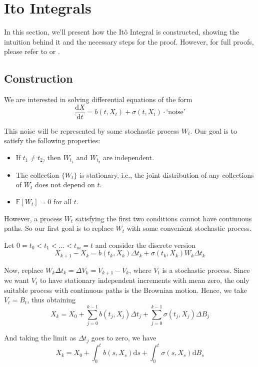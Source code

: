 \documentclass[12pt,a4paper]{article}
\theoremstyle{definition}
\begin{document}
\newpage
\section{Ito Integrals}


In this section, we'll present how the Itô Integral is constructed, showing the intuition behind it and the necessary steps for the proof. However, for full proofs, please refer to \cite{oksendal2013stochastic} or \cite{shreve2004stochastic}.

\subsection{Construction}

We are interested in solving differential equations of the form
\[
	\frac{\mathrm{d}X}{\mathrm{d}t} = b(t,X_t) + \sigma(t,X_t)\cdot \text{`noise'}
\]

This noise will be represented by some stochastic process $W_t$. Our goal is to satisfy the following properties:
\begin{itemize}
	\item If $t_1 \neq t_2$, then $W_{t_1}$ and $W_{t_2}$ are independent.
	\item The collection $\{W_t\}$ is stationary, i.e., the joint distribution of any collections of $W_t$ does not depend on $t$.
	\item $\mathbb{E}[W_t] = 0$ for all $t$.
\end{itemize}

However, a process $W_t$ satisfying the first two conditions cannot have continuous paths. So our first goal is to replace $W_t$ with some convenient stochastic process.

Let $0 = t_0 < t_1 < \ldots < t_m = t$ and consider the discrete version
\[
	X_{k+1} - X_k = b(t_k,X_k)\Delta t_k + \sigma(t_k,X_k)W_k \Delta t_k
\]

Now, replace $W_k \Delta t_k = \Delta V_k = V_{k+1} - V_k$, where $V_t$ is a stochastic process. Since we want $V_t$ to have stationary independent increments with mean zero, the only suitable process with continuous paths is the Brownian motion. Hence, we take $V_t = B_t$, thus obtaining
\[
	X_k = X_0 + \sum_{j=0}^{k-1} b(t_j, X_j) \Delta t_j + \sum_{j=0}^{k-1} \sigma(t_j, X_j) \Delta B_j
\]

And taking the limit as $\Delta t_j$ goes to zero, we have
\[
	X_k = X_0 + \int_0^t b(s, X_s) \mathrm{d}s + \int_0^t \sigma(s, X_s) \mathrm{d}B_s
\]
\end{document}
